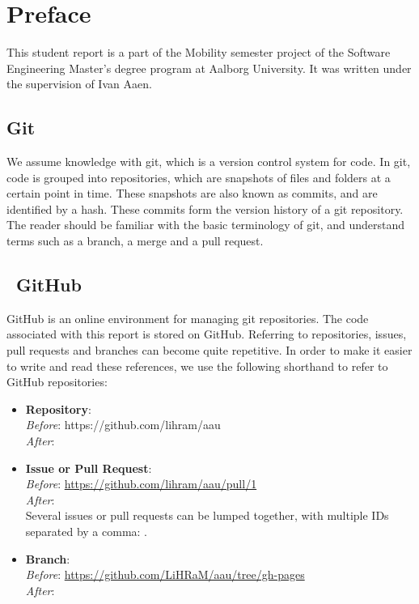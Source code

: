 \chapter*{Preface}
This student report is a part of the Mobility semester project of the Software Engineering Master's degree program at Aalborg University.
It was written under the supervision of Ivan Aaen.

\section*{Git}

We assume knowledge with git\cite{git}, which is a version control system for code.
In git, code is grouped into repositories, which are snapshots of files and folders at a certain point in time.
These snapshots are also known as commits, and are identified by a hash.
These commits form the version history of a git repository.
The reader should be familiar with the basic terminology of git, and understand terms such as a branch, a merge and a pull request.


\section*{\faGithub~GitHub}
GitHub is an online environment for managing git repositories.
The code associated with this report is stored on GitHub.
Referring to repositories, issues, pull requests and branches can become quite repetitive.
In order to make it easier to write and read these references, we use the following shorthand to refer to GitHub repositories:
\begin{itemize}
      \item{
            \textbf{Repository}: \\
            \textit{Before}: https://github.com/lihram/aau\\
            \textit{After}: 
            }
      \item{
            \textbf{Issue or Pull Request}: \\
            \textit{Before}: \url{https://github.com/lihram/aau/pull/1}\\
            \textit{After}: \\
            Several issues or pull requests can be lumped together, with multiple IDs separated by a comma: .
            }
      \item{
            \textbf{Branch}: \\
            \textit{Before}: \url{https://github.com/LiHRaM/aau/tree/gh-pages}\\
            \textit{After}: 
            }
\end{itemize}

\listoftodos
